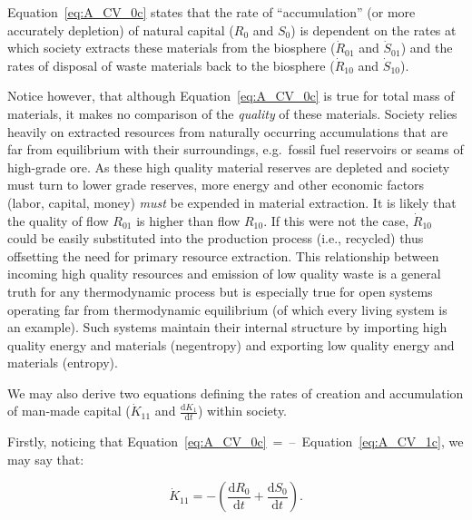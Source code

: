 Equation~\ref{eq:A_CV_0c} states that the rate of ``accumulation'' 
(or more accurately depletion) of natural capital ($R_{0}$ and $S_{0}$) 
is dependent on the rates at which society extracts these materials
from the biosphere ($\dot{R}_{01}$ and $\dot{S}_{01}$) and the rates
of disposal of waste materials back to the biosphere ($\dot{R}_{10}$ 
and $\dot{S}_{10}$). 

Notice however, that although Equation~\ref{eq:A_CV_0c} is true for total mass of materials,
it makes no comparison of the \emph{quality} of these materials.
Society relies heavily on extracted resources from naturally
occurring accumulations that are far from equilibrium with their surroundings,
e.g.\ fossil fuel reservoirs or seams of high-grade ore. As these high quality
material reserves are depleted and society must turn to lower grade reserves, 
more energy and other economic factors (labor, capital, money) \emph{must} be 
expended  in material extraction.\cite{Mudd2010} It is likely that the quality
of flow $R_{01}$ is higher than flow $R_{10}$. If this were not the case,
$\dot{R}_{10}$ could be easily substituted into the production process (i.e., recycled) thus
offsetting the need for primary resource extraction. This relationship between 
incoming high quality resources and emission of low
quality waste is a general truth for any thermodynamic process but is especially
true for open systems operating far from thermodynamic equilibrium (of which every
living system is an example). Such systems maintain their internal structure by
importing high quality energy and materials (negentropy) and exporting low quality
energy and materials (entropy).\cite{Schroedinger1947} 



We may also derive two equations defining the rates of creation and accumulation
of man-made capital ($\dot{K}_{11}$ and $\frac{\mathrm{d}K_{1}}{\mathrm{d}t}$) within
society. %

Firstly,
noticing that Equation~\ref{eq:A_CV_0c}~=~--~Equation~\ref{eq:A_CV_1c},
we may say that:

\begin{equation}
\label{eq:A_K_11}
	\dot{K}_{11}
	= - \left(
	\frac{\mathrm{d}R_0}{\mathrm{d}t}		
	+	\frac{\mathrm{d}S_0}{\mathrm{d}t}
	\right).
\end{equation}

